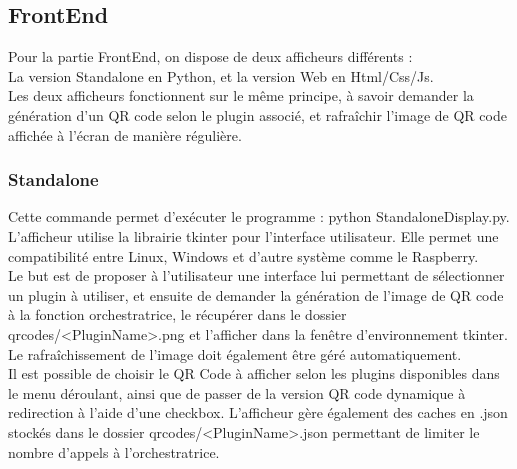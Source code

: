 \documentclass[a4paper,12pt]{article}
\begin{document}
\subsection{FrontEnd}
\label{frontend}

\noindent Pour la partie FrontEnd, on dispose de deux afficheurs différents :\\
La version Standalone en Python, et la version Web en Html/Css/Js.\\
Les deux afficheurs fonctionnent sur le même principe, à savoir demander la génération d'un QR code selon le plugin associé, et rafraîchir l'image de QR code affichée à l'écran de manière régulière.

\subsubsection{Standalone}
\noindent Cette commande permet d'exécuter le programme : python StandaloneDisplay.py.\\
L'afficheur utilise la librairie tkinter pour l'interface utilisateur. Elle permet une compatibilité entre Linux, Windows et d'autre système comme le Raspberry.\\
Le but est de proposer à l'utilisateur une interface lui permettant de sélectionner un plugin à utiliser, et ensuite de demander la génération de l'image de QR code à la fonction orchestratrice, le récupérer dans le dossier qrcodes/<PluginName>.png et l'afficher dans la fenêtre d'environnement tkinter. Le rafraîchissement de l'image doit également être géré automatiquement.\\

\noindent Il est possible de choisir le QR Code à afficher selon les plugins disponibles dans le menu déroulant, ainsi que de passer de la version QR code dynamique à redirection à l'aide d'une checkbox.
L'afficheur gère également des caches en .json stockés dans le dossier qrcodes/<PluginName>.json permettant de limiter le nombre d'appels à l'orchestratrice.\\
\end{document}
